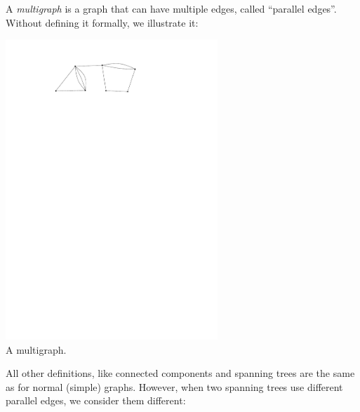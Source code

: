 \documentclass[12pt,a4]{article}
\begin{document}
A {\em multigraph} is a graph that can have multiple edges, called
``parallel edges''. Without defining 
it formally, we illustrate it:
\begin{center}
  \includegraphics[width=0.6\textwidth]{figures/multigraph.pdf}\\
  A multigraph.
\end{center}
All other definitions, like connected components and spanning trees
are the same as for normal (simple) graphs. However,
when two spanning trees use different parallel edges, we consider them
different:
\end{document}
